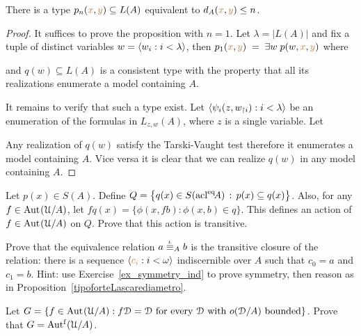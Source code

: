 \begin{proposition}\label{prop_Lascar_distance_type_def}
There is a type $p_n({\color{brown} x},{\color{brown} y})\subseteq L(A)$ equivalent to $d_A({\color{brown} x},{\color{brown} y})\le n$.  
\end{proposition}
\begin{proof}
It suffices to prove the proposition with $n=1$.
Let $\lambda=|L(A)|$ and fix a tuple of distinct variables $w=\langle w_i:i<\lambda\rangle$, then $p_1({\color{brown} x},{\color{brown} y})\;=\;\exists w\;p(w,{\color{brown} x},{\color{brown} y})$ where


and $q(w)\subseteq L(A)$ is a consistent type with the property that all its realizations enumerate a model containing $A$.

It remains to verify that such a type exist.
Let $\langle\psi_i(z,w_{\restriction i}):i<\lambda\rangle$ be an enumeration of the formulas in $L_{z,w}(A)$, where $z$ is a single variable.
Let 


Any realization of $q(w)$ satisfy the Tarski-Vaught test therefore it enumerates a model containing $A$.
Vice versa it is clear that we can realize $q(w)$ in any model containing $A$.
\end{proof}

\begin{exercise}
  Let $p(x)\in S(A)$.
  Define $Q=\big\{q(x)\in S({\rm acl}^{{\rm eq}}\!A)\, :\, p(x)\subseteq q(x)\big\}$.
  Also, for any $f\in{\rm Aut\kern.15ex}(\EuScript U/A)$, let $fq(x)=\{\phi(x,fb):\phi(x,b)\in q\}$.
  This defines an action of $f\in{\rm Aut\kern.15ex}(\EuScript U/A)$ on $Q$.
  Prove that this action is transitive.
\end{exercise}

\begin{exercise}\label{ex_Lstp_indiscernibles}
  Prove that the equivalence relation $a\stackrel{\smash{\scalebox{.5}{\rm L}}}{\equiv}_Ab$ is the transitive closure of the relation: there is a sequence $\langle{\color{brown}c_i}:i<\omega\rangle$ indiscernible over $A$ such that $c_0=a$ and $c_1=b$.
  Hint: use Exercise~\ref{ex_symmetry_ind} to prove symmetry, then reason as in Proposition~\ref{tipoforteLascarediametro}.
\end{exercise}

\begin{exercise}
  Let $G=\{f\in{\rm Aut\kern.15ex}(\EuScript U/A) : f\EuScript D=\EuScript D \textrm{ for every }\EuScript D \textrm{ with }o(\EuScript D/A)\textrm{ bounded}\}$. 
  Prove that $G=\mbox{Aut$^{\rm f}$}(\EuScript U/A)$.
\end{exercise}

